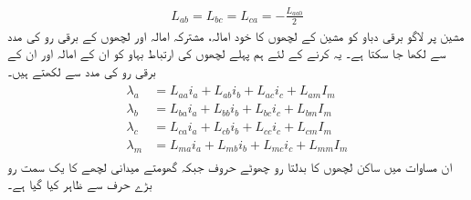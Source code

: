 \begin{align}\label{مساوات_معاصر_ساکن_مشترکہ_امالہ}
L_{ab}=L_{bc}=L_{ca}=-\frac{L_{aa0}}{2}
\end{align}
%
مشین پر لاگو برقی دباو کو مشین کے لچھوں کا خود امالہ، مشترکہ امالہ اور لچھوں کے برقی رو کی مدد سے لکھا جا سکتا ہے۔ یہ کرنے کے لئے ہم پہلے  لچھوں کی ارتباط بہاو  کو ان کے امالہ اور ان کے برقی رو کی مدد سے لکھتے ہیں۔
\begin{gather}
\begin{aligned}\label{مساوات_معاصر_ارتباط_چار}
\lambda_a&=L_{aa} i_a+L_{ab} i_b +L_{ac} i_c+L_{am} I_m\\
\lambda_b&=L_{ba} i_a+L_{bb} i_b +L_{bc} i_c+L_{bm} I_m\\
\lambda_c&=L_{ca} i_a+L_{cb} i_b +L_{cc} i_c+L_{cm} I_m\\
\lambda_m&=L_{ma} i_a+L_{mb} i_b +L_{mc} i_c+L_{mm} I_m
\end{aligned}
\end{gather}
ان مساوات میں ساکن لچھوں کا بدلتا رو  چھوٹے حروف   جبکہ گھومتے میدانی لچھے کا یک سمت   رو  بڑے حرف   سے ظاہر کیا گیا ہے۔

